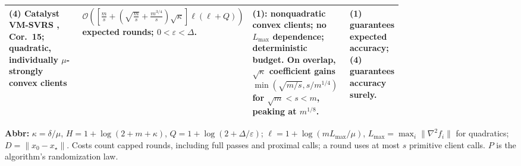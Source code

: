 \begin{table}[tp]
\begin{threeparttable}
\begin{tabularx}{\linewidth}{@{}>{\raggedright\arraybackslash}p{0.20\linewidth}>{\raggedright\arraybackslash}p{0.32\linewidth}>{\raggedright\arraybackslash}p{0.25\linewidth}>{\raggedright\arraybackslash}X@{}}
\midrule
\textbf{(4)} Catalyst VM-SVRS \citep{chsWang2026v1}, Cor.~15; quadratic, individually $\mu$-strongly convex clients & $\mathcal{O}\!\left(\left[\frac ms+\left(\sqrt{\frac ms}+\frac{m^{3/4}}s\right)\sqrt\kappa\right]\ell(\ell+Q)\right)$ expected rounds; $0<\varepsilon<\Delta$. & \textbf{(1)}: nonquadratic convex clients; no $L_{\max}$ dependence; deterministic budget. On overlap, $\sqrt\kappa$ coefficient gains $\min(\sqrt{m/s},s/m^{1/4})$ for $\sqrt m<s<m$, peaking at $m^{1/8}$. & \textbf{(1)} guarantees expected accuracy; \textbf{(4)} guarantees accuracy surely. \\
\bottomrule
\end{tabularx}
\begin{tablenotes}[flushleft]\footnotesize
\item[] \textbf{Abbr:} $\kappa=\delta/\mu$, $H=1+\log(2+m+\kappa)$, $Q=1+\log(2+\Delta/\varepsilon)$; $\ell=1+\log(mL_{\max}/\mu)$, $L_{\max}=\max_i\|\nabla^2 f_i\|$ for quadratics; $D=\|x_0-x_\star\|$. Costs count capped rounds, including full passes and proximal calls; a round uses at most $s$ primitive client calls. $P$ is the algorithm's randomization law.
\end{tablenotes}
\end{threeparttable}
\end{table}
\clearpage
